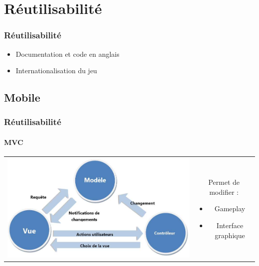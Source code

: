 \section{Réutilisabilité}

	\begin{frame}
	\frametitle{Réutilisabilité}
	
		\begin{itemize}
			\item Documentation et code en anglais
			\item Internationalisation du jeu
		\end{itemize}
	
	\end{frame}

\subsection{Mobile}

	\begin{frame}
	\frametitle{Réutilisabilité}
	\framesubtitle{MVC}
	
		\begin{tabular}{cc}
			\begin{minipage}{6cm}
				\includegraphics[scale=0.4]{img/mvc.jpg} 
			\end{minipage}
			&
			\begin{minipage}{4cm}
			Permet de modifier :
			\begin{itemize} 
				\item Gameplay
				\item Interface graphique
			\end{itemize} 
			\end{minipage}
		\end{tabular}	
	\end{frame}

